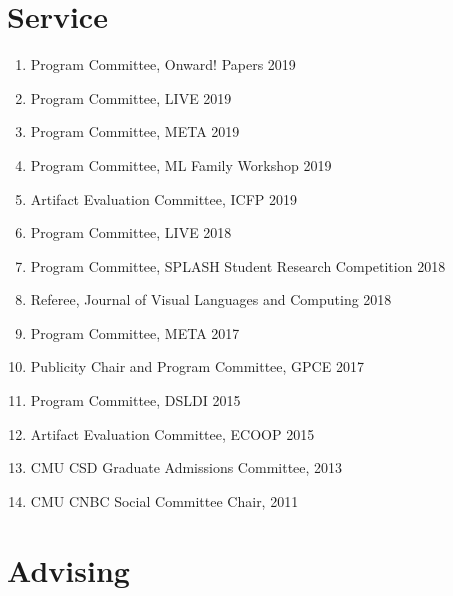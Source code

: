 \documentclass[10pt,letterpaper]{article}
\begin{document}
\section*{Service}
\begin{enumerate}
  \item Program Committee, Onward! Papers 2019	
  \item Program Committee, LIVE 2019
  \item Program Committee, META 2019
  \item Program Committee, ML Family Workshop 2019
  \item Artifact Evaluation Committee, ICFP 2019
  \item Program Committee, LIVE 2018
  \item Program Committee, SPLASH Student Research Competition 2018
  \item Referee, Journal of Visual Languages and Computing 2018
  \item Program Committee, META 2017
  \item Publicity Chair and Program Committee, GPCE 2017
  \item Program Committee, DSLDI 2015
  \item Artifact Evaluation Committee, ECOOP 2015
  \item CMU CSD Graduate Admissions Committee, 2013
  \item CMU CNBC Social Committee Chair, 2011
\end{enumerate}

\section*{Advising}
\end{document}
